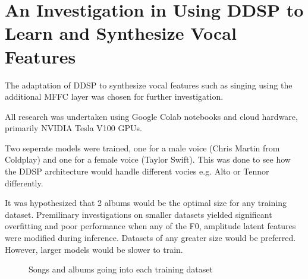 \chapter{An Investigation in Using DDSP to Learn and Synthesize Vocal Features}

The adaptation of DDSP to synthesize vocal features such as singing using the additional MFFC layer was chosen for further investigation.

All research was undertaken using Google Colab notebooks and cloud hardware, primarily NVIDIA Tesla V100 GPUs.

Two seperate models were trained, one for a male voice (Chris Martin from Coldplay) and one for a female voice (Taylor Swift). This was done to see how the DDSP architecture would handle different vocies e.g. Alto or Tennor differently.

It was hypothesized that 2 albums would be the optimal size for any training dataset. Premilinary investigations on smaller datasets yielded significant overfitting and poor performance when any of the F0, amplitude latent features were modified during inference. Datasets of any greater size would be preferred. However, larger models would be slower to train.

\begin{figure}
    \centering
    \caption{Songs and albums going into each training dataset}
\end{figure}





